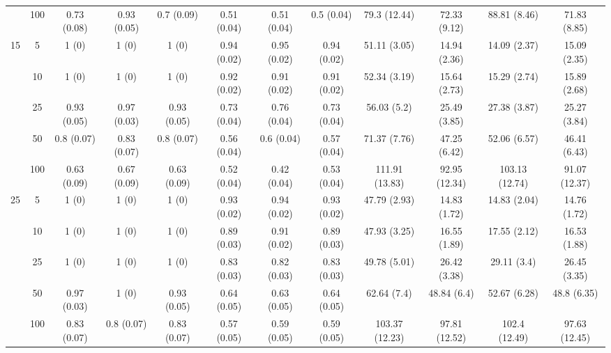\documentclass[10pt]{article}
\theoremstyle{definition}
\begin{document}
\begin{table}[H]
\begin{center}
{\begin{tabular}{cc|ccc|ccc|cccc|}
    & 100  & 0.73 (0.08) & 0.93 (0.05) & 0.7 (0.09) & 0.51 (0.04) & 0.51 (0.04) & 0.5 (0.04) & 79.3 (12.44) & 72.33 (9.12) & 88.81 (8.46) & 71.83 (8.85) \\[.3cm] 
   \multirow{5}{*}{15} & 5  & 1 (0) & 1 (0) & 1 (0) & 0.94 (0.02) & 0.95 (0.02) & 0.94 (0.02) & 51.11 (3.05) & 14.94 (2.36) & 14.09 (2.37) & 15.09 (2.35) \\ 
    & 10  & 1 (0) & 1 (0) & 1 (0) & 0.92 (0.02) & 0.91 (0.02) & 0.91 (0.02) & 52.34 (3.19) & 15.64 (2.73) & 15.29 (2.74) & 15.89 (2.68) \\ 
    & 25  & 0.93 (0.05) & 0.97 (0.03) & 0.93 (0.05) & 0.73 (0.04) & 0.76 (0.04) & 0.73 (0.04) & 56.03 (5.2) & 25.49 (3.85) & 27.38 (3.87) & 25.27 (3.84) \\ 
    & 50  & 0.8 (0.07) & 0.83 (0.07) & 0.8 (0.07) & 0.56 (0.04) & 0.6 (0.04) & 0.57 (0.04) & 71.37 (7.76) & 47.25 (6.42) & 52.06 (6.57) & 46.41 (6.43) \\ 
    & 100  & 0.63 (0.09) & 0.67 (0.09) & 0.63 (0.09) & 0.52 (0.04) & 0.42 (0.04) & 0.53 (0.04) & 111.91 (13.83) & 92.95 (12.34) & 103.13 (12.74) & 91.07 (12.37) \\[.3cm] 
   \multirow{5}{*}{25} & 5  & 1 (0) & 1 (0) & 1 (0) & 0.93 (0.02) & 0.94 (0.02) & 0.93 (0.02) & 47.79 (2.93) & 14.83 (1.72) & 14.83 (2.04) & 14.76 (1.72) \\ 
    & 10  & 1 (0) & 1 (0) & 1 (0) & 0.89 (0.03) & 0.91 (0.02) & 0.89 (0.03) & 47.93 (3.25) & 16.55 (1.89) & 17.55 (2.12) & 16.53 (1.88) \\ 
    & 25  & 1 (0) & 1 (0) & 1 (0) & 0.83 (0.03) & 0.82 (0.03) & 0.83 (0.03) & 49.78 (5.01) & 26.42 (3.38) & 29.11 (3.4) & 26.45 (3.35) \\ 
    & 50  & 0.97 (0.03) & 1 (0) & 0.93 (0.05) & 0.64 (0.05) & 0.63 (0.05) & 0.64 (0.05) & 62.64 (7.4) & 48.84 (6.4) & 52.67 (6.28) & 48.8 (6.35) \\ 
    & 100  & 0.83 (0.07) & 0.8 (0.07) & 0.83 (0.07) & 0.57 (0.05) & 0.59 (0.05) & 0.59 (0.05) & 103.37 (12.23) & 97.81 (12.52) & 102.4 (12.49) & 97.63 (12.45) \\
\end{tabular}}
   \end{center}
      \vspace{-.5cm}
\end{table}
\end{document}
